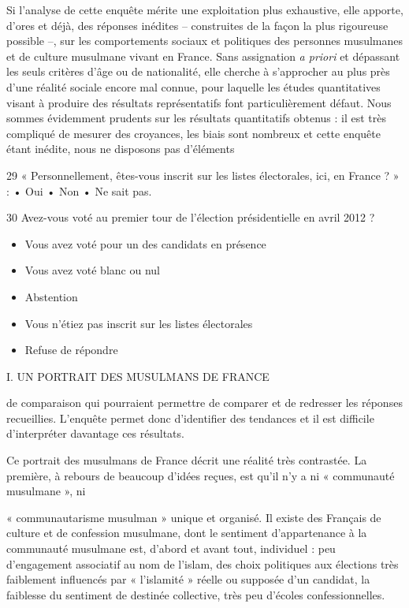 Si l'analyse de cette enquête mérite une exploitation plus exhaustive,
elle apporte, d'ores et déjà, des réponses inédites -- construites de la
façon la plus rigoureuse possible --, sur les comportements sociaux et
politiques des personnes musulmanes et de culture musulmane vivant en
France. Sans assignation \emph{a priori} et dépassant les seuls critères
d'âge ou de nationalité, elle cherche à s'approcher au plus près d'une
réalité sociale encore mal connue, pour laquelle les études
quantitatives visant à produire des résultats représentatifs font
particulièrement défaut. Nous sommes évidemment prudents sur les
résultats quantitatifs obtenus : il est très compliqué de mesurer des
croyances, les biais sont nombreux et cette enquête étant inédite, nous
ne disposons pas d'éléments

29 « Personnellement, êtes-vous inscrit sur les listes électorales, ici,
en France ? » : • Oui • Non • Ne sait pas.

30 Avez-vous voté au premier tour de l'élection présidentielle en avril
2012 ?


\begin{itemize}
\item
  Vous avez voté pour un des candidats en présence
\item
  Vous avez voté blanc ou nul
\item
  Abstention
\item
  Vous n'étiez pas inscrit sur les listes électorales
\item
  Refuse de répondre
\end{itemize}


I. UN PORTRAIT DES MUSULMANS DE FRANCE

de comparaison qui pourraient permettre de comparer et de redresser les
réponses recueillies. L'enquête permet donc d'identifier des tendances
et il est difficile d'interpréter davantage ces résultats.

Ce portrait des musulmans de France décrit une réalité très contrastée.
La première, à rebours de beaucoup d'idées reçues, est qu'il n'y a ni «
communauté musulmane », ni

« communautarisme musulman » unique et organisé. Il existe des Français
de culture et de confession musulmane, dont le sentiment d'appartenance
à la communauté musulmane est, d'abord et avant tout, individuel : peu
d'engagement associatif au nom de l'islam, des choix politiques aux
élections très faiblement influencés par « l'islamité » réelle ou
supposée d'un candidat, la faiblesse du sentiment de destinée
collective, très peu d'écoles confessionnelles.

